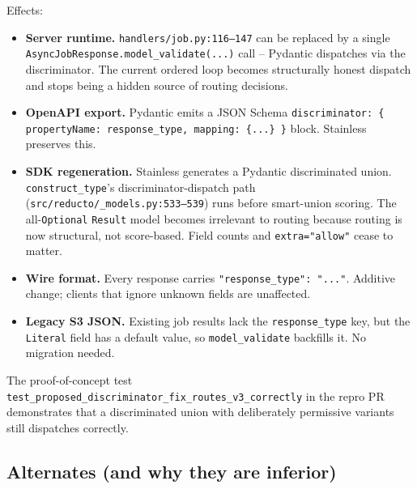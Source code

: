 \documentclass[11pt]{article}
\begin{document}
Effects:
\begin{itemize}
  \item \textbf{Server runtime.} \texttt{handlers/job.py:116--147} can be replaced by a single \texttt{AsyncJobResponse.model\_validate(...)} call -- Pydantic dispatches via the discriminator. The current ordered loop becomes structurally honest dispatch and stops being a hidden source of routing decisions.
  \item \textbf{OpenAPI export.} Pydantic emits a JSON Schema \texttt{discriminator: \{ propertyName: response\_type, mapping: \{...\} \}} block. Stainless preserves this.
  \item \textbf{SDK regeneration.} Stainless generates a Pydantic discriminated union. \texttt{construct\_type}'s discriminator-dispatch path (\texttt{src/reducto/\_models.py:533--539}) runs before smart-union scoring. The all-\texttt{Optional} \texttt{Result} model becomes irrelevant to routing because routing is now structural, not score-based. Field counts and \texttt{extra="allow"} cease to matter.
  \item \textbf{Wire format.} Every response carries \texttt{"response\_type": "..."}. Additive change; clients that ignore unknown fields are unaffected.
  \item \textbf{Legacy S3 JSON.} Existing job results lack the \texttt{response\_type} key, but the \texttt{Literal} field has a default value, so \texttt{model\_validate} backfills it. No migration needed.
\end{itemize}

The proof-of-concept test \texttt{test\_proposed\_discriminator\_fix\_routes\_v3\_correctly} in the repro PR demonstrates that a discriminated union with deliberately permissive variants still dispatches correctly.

\subsection{Alternates (and why they are inferior)}
\end{document}
